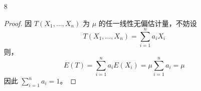 \documentclass[normal,founder,mtpro2,cn]{elegantnote}
\begin{document}
\begin{enumerate}
\begin{proof}
            同时，
            \begin{equation*}
                \begin{aligned}
                    \operatorname{Var}(Y)= & a^{2}\operatorname{Var}\left(\bar{X}_{1}\right)+b^{2}\operatorname{Var}\left(\bar{X}_{2}\right) \\
                    =                      & a^{2}\cdot\frac{\sigma^{2}}{n_{1}}+(1-a)^{2}\cdot\frac{\sigma^{2}}{n_{2}}                       \\
                    =                      & \left(\frac{n_{1}+n_{2}}{n_{1}n_{2}}a^{2}-\frac{2}{n_{2}}a+\frac{1}{n_{2}}\right) \sigma^{2}
                \end{aligned}
            \end{equation*}

            对 $\operatorname{Var}(Y)$ 求导，可得
            \begin{equation*}
                \frac{\partial\operatorname{Var}(Y)}{\partial a}=\left(\frac{n_{1}+n_{2}}{n_{1}n_{2}}\cdot2a-\frac{2}{n_{2}}\right)\sigma^{2}
            \end{equation*}
            令 $\frac{\partial\operatorname{Var}(Y)}{\partial a}=0$，得 $a=\frac{n_{1}}{n_{1}+n_{2}}$。

            同时，
            \begin{equation*}
                \frac{\partial^{2}\operatorname{Var}(Y)}{\partial^{2}a}=\frac{n_{1}+n_{2}}{n_{1}n_{2}}\cdot 2\sigma^{2}>0
            \end{equation*}

            故当 $a=\frac{n_{1}}{n_{1}+n_{2}},\quad b=1-a=\frac{n_{2}}{n_{1}+n_{2}}$ 时，$\operatorname{Var}(Y)$ 达到最小，此时 $\frac{1}{n_{1}+n_{2}}\sigma^{2}$。
        \end{proof}
    \item[8]
        \begin{proof}
            因 $T\left(X_{1},\ldots,X_{n}\right)$ 为 $\mu$ 的任一线性无偏估计量，不妨设
            \begin{equation*}
                T\left(X_{1},\ldots,X_{n}\right)=\sum_{i=1}^{n}a_{i}X_{i}
            \end{equation*}
            则，
            \begin{equation*}
                E(T)=\sum_{i=1}^{n}a_{i}E\left(X_{i}\right)=\mu\sum_{i=1}^{n}a_{i}=\mu
            \end{equation*}
            因此 $\sum_{i=1}^{n}a_{i}=1$。


\end{proof}
\end{enumerate}
\end{document}
